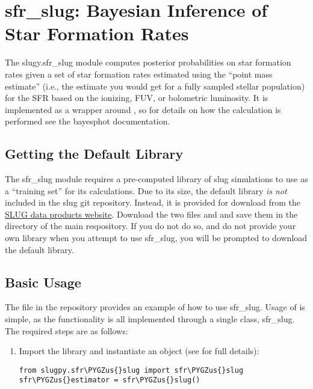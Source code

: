 \documentclass[letterpaper,10pt,english]{sphinxmanual}
\def\PYGZus{\char`\_}
\begin{document}
\chapter{sfr\_slug: Bayesian Inference of Star Formation Rates}
\label{sfr_slug:sfr-slug-bayesian-inference-of-star-formation-rates}\label{sfr_slug::doc}\label{sfr_slug:sec-sfr-slug}
The slugy.sfr\_slug module computes posterior probabilities on star formation rates given a set of star formation rates estimated using the ``point mass estimate'' (i.e., the estimate you would get for a fully sampled stellar population) for the SFR based on the ionizing, FUV, or bolometric luminosity. It is implemented as a wrapper around {\hyperref[bayesphot:sec-bayesphot]{\emph{}}}, so for details on how the calculation is performed see the bayesphot documentation.


\section{Getting the Default Library}
\label{sfr_slug:getting-the-default-library}
The sfr\_slug module requires a pre-computed library of slug simulations to use as a ``training set'' for its calculations. Due to its size, the default library \emph{is not} included in the slug git repository. Instead, it is provided for download from the \href{http://www.slugsps.com/data}{SLUG data products website}. Download the two files  and  and save them in the  directory of the main respository. If you do not do so, and do not provide your own library when you attempt to use sfr\_slug, you will be prompted to download the default library.


\section{Basic Usage}
\label{sfr_slug:basic-usage}
The  file in the repository provides an example of how to use sfr\_slug. Usage of is simple, as the functionality is all implemented through a single class, sfr\_slug. The required steps are as follows:
\begin{enumerate}
\item {} 
Import the library and instantiate an  object (see {\hyperref[sfr_slug:sec-sfr-slug-full]{\emph{}}} for full details):

\begin{Verbatim}[commandchars=\\\{\}]
from slugpy.sfr\PYGZus{}slug import sfr\PYGZus{}slug
sfr\PYGZus{}estimator = sfr\PYGZus{}slug()
\end{Verbatim}

\end{enumerate}
\end{document}
